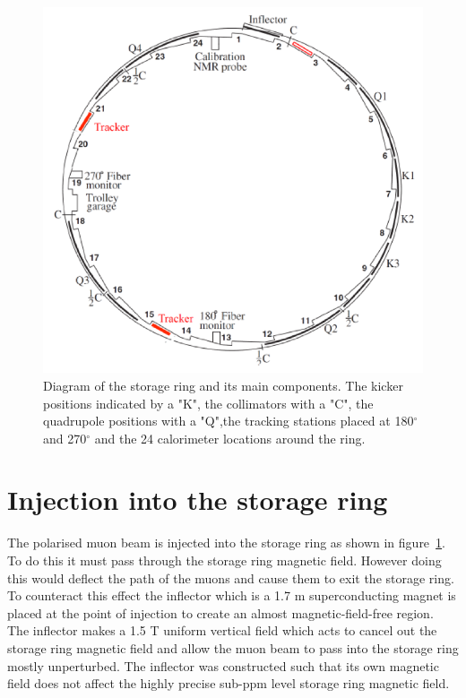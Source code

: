 \begin{figure}[th]
\centering
\includegraphics{Figures/ringcomponents}
\decoRule
\caption{Diagram of the storage ring and its main components. The kicker positions indicated by a "K", the collimators with a "C", the quadrupole positions with a "Q",the tracking stations placed at 180$^\circ$ and 270$^\circ$ and the 24 calorimeter locations around the ring.}
\label{fig:ringcomponents}
\end{figure}

\section{Injection into the storage ring}

The polarised muon beam is injected into the storage ring as shown in figure~\ref{fig:ringcomponents}. To do this it must pass through the storage ring magnetic field. However doing this would deflect the path of the muons and cause them to exit the storage ring. To counteract this effect the inflector which is a 1.7 m superconducting magnet is placed at the point of injection to create an almost magnetic-field-free region. The inflector makes a 1.5 T uniform vertical field which acts to cancel out the storage ring magnetic field and allow the muon beam to pass into the storage ring mostly unperturbed. The inflector was constructed such that its own magnetic field does not affect the highly precise sub-ppm level storage ring magnetic field.

